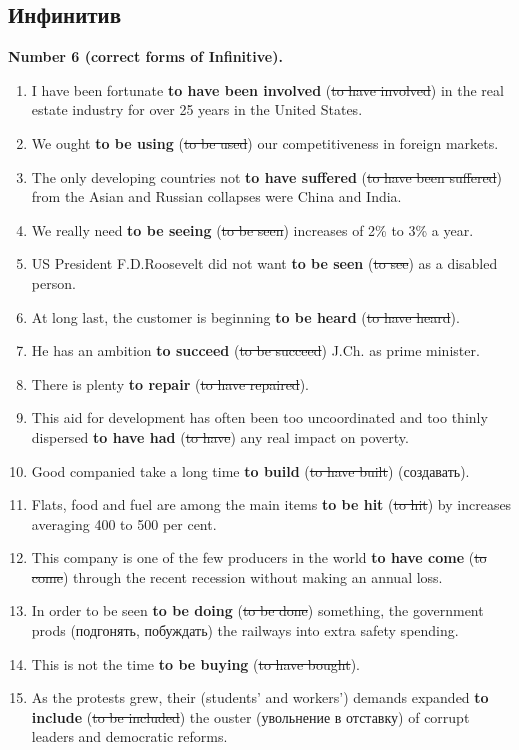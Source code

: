 \documentclass[main.tex]{subfiles}
\begin{document}
\subsection{Инфинитив}

\textbf{Number 6 (correct forms of Infinitive).}

\begin{enumerate}[nosep]
	\item I have been fortunate \textbf{to have been involved} (\st{to have involved}) in the real estate industry for over 25 years in the United States.
	\item We ought \textbf{to be using} (\st{to be used}) our competitiveness in foreign markets.
	\item The only developing countries not \textbf{to have suffered} (\st{to have been suffered}) from the Asian and Russian collapses were China and India.
	\item We really need \textbf{to be seeing} (\st{to be seen}) increases of 2\% to 3\% a year.
	\item US President F.D.Roosevelt did not want \textbf{to be seen} (\st{to see}) as a disabled person.
	\item At long last, the customer is beginning \textbf{to be heard} (\st{to have heard}).
	\item He has an ambition \textbf{to succeed} (\st{to be succeed}) J.Ch. as prime minister.
	\item There is plenty \textbf{to repair} (\st{to have repaired}).
	\item This aid for development has often been too uncoordinated and too thinly dispersed \textbf{to have had} (\st{to have}) any real impact on poverty.
	\item Good companied take a long time \textbf{to build} (\st{to have built}) (создавать).
	\item Flats, food and fuel are among the main items \textbf{to be hit} (\st{to hit}) by increases averaging 400 to 500 per cent.
	\item This company is one of the few producers in the world \textbf{to have come} (\st{to come}) through the recent recession without making an annual loss.
	\item In order to be seen \textbf{to be doing} (\st{to be done}) something, the government prods (подгонять, побуждать) the railways into extra safety spending.
	\item This is not the time \textbf{to be buying} (\st{to have bought}).
	\item As the protests grew, their (students' and workers') demands expanded \textbf{to include} (\st{to be included}) the ouster (увольнение в отставку) of corrupt leaders and democratic reforms.

\end{enumerate}
\end{document}
